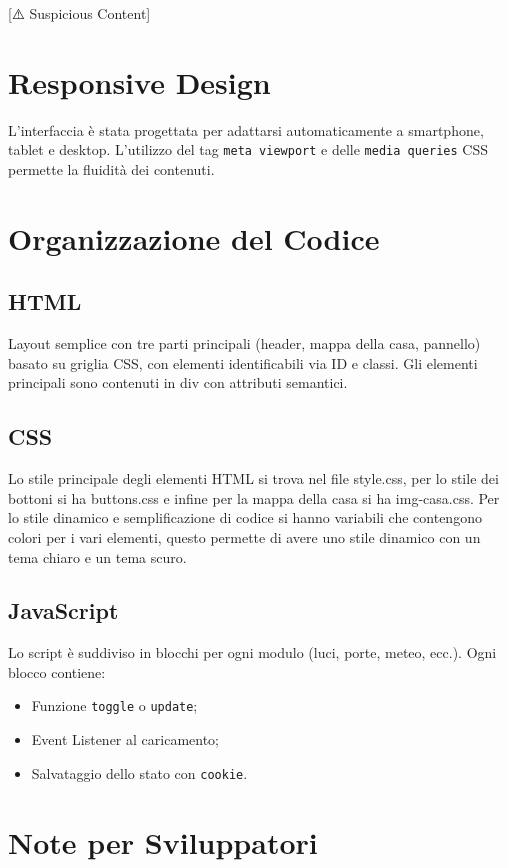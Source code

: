 [⚠️ Suspicious Content] \documentclass[a4paper,12pt]{article}
\begin{document}
\section{Responsive Design}

L’interfaccia è stata progettata per adattarsi automaticamente a smartphone, tablet e desktop. L’utilizzo del tag \texttt{meta viewport} e delle \texttt{media queries} CSS permette la fluidità dei contenuti.

\section{Organizzazione del Codice}

\subsection*{HTML}

Layout semplice con tre parti principali (header, mappa della casa, pannello) basato su griglia CSS, con elementi identificabili via ID e classi. Gli elementi principali sono contenuti in div con attributi semantici.

\subsection*{CSS}

Lo stile principale degli elementi HTML si trova nel file style.css, per lo stile dei bottoni si ha buttons.css e infine per la mappa della casa si ha img-casa.css. Per lo stile dinamico e semplificazione di codice si hanno variabili che contengono colori per i vari elementi, questo permette di avere uno stile dinamico con un tema chiaro e un tema scuro.

\subsection*{JavaScript}

Lo script è suddiviso in blocchi per ogni modulo (luci, porte, meteo, ecc.). Ogni blocco contiene:

\begin{itemize}
  \item Funzione \texttt{toggle} o \texttt{update};
  \item Event Listener al caricamento;
  \item Salvataggio dello stato con \texttt{cookie}.
\end{itemize}

\section{Note per Sviluppatori}
\end{document}
